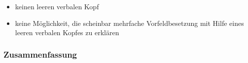 {{\begin{itemize}
unterschiedliche Verzweigungen:
\eal
\ex {}[[[Gibt er] dem Mann] den Ball]?
\ex {}[Hat [er [dem Mann [den Ball gegeben]]]]?
\zl
\pause
\item keinen leeren verbalen Kopf 
\pause
\item keine Möglichkeit, die scheinbar mehrfache
Vorfeldbesetzung mit Hilfe eines leeren verbalen Kopfes zu erklären
\end{itemize}

}

\subsubsection{Zusammenfassung}



} %


